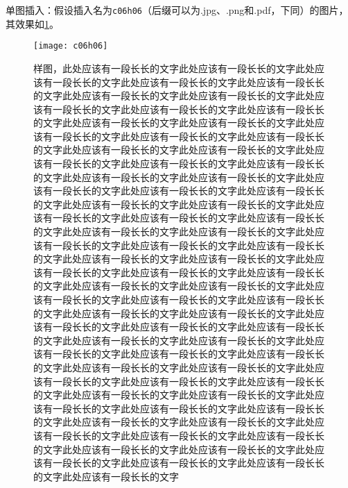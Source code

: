 {单图插入：假设插入名为\verb|c06h06|（后缀可以为.jpg、.png和.pdf，下同）的图片，其效果如\ref{fig:c06h06}。
\begin{figure}[!htbp]
    \centering
    \texttt{[image: c06h06]}
    \caption{样图，此处应该有一段长长的文字此处应该有一段长长的文字此处应该有一段长长的文字此处应该有一段长长的文字此处应该有一段长长的文字此处应该有一段长长的文字此处应该有一段长长的文字此处应该有一段长长的文字此处应该有一段长长的文字此处应该有一段长长的文字此处应该有一段长长的文字此处应该有一段长长的文字此处应该有一段长长的文字此处应该有一段长长的文字此处应该有一段长长的文字此处应该有一段长长的文字此处应该有一段长长的文字此处应该有一段长长的文字此处应该有一段长长的文字此处应该有一段长长的文字此处应该有一段长长的文字此处应该有一段长长的文字此处应该有一段长长的文字此处应该有一段长长的文字此处应该有一段长长的文字此处应该有一段长长的文字此处应该有一段长长的文字此处应该有一段长长的文字此处应该有一段长长的文字此处应该有一段长长的文字此处应该有一段长长的文字此处应该有一段长长的文字此处应该有一段长长的文字此处应该有一段长长的文字此处应该有一段长长的文字此处应该有一段长长的文字此处应该有一段长长的文字此处应该有一段长长的文字此处应该有一段长长的文字此处应该有一段长长的文字此处应该有一段长长的文字此处应该有一段长长的文字此处应该有一段长长的文字此处应该有一段长长的文字此处应该有一段长长的文字此处应该有一段长长的文字此处应该有一段长长的文字此处应该有一段长长的文字此处应该有一段长长的文字此处应该有一段长长的文字此处应该有一段长长的文字此处应该有一段长长的文字此处应该有一段长长的文字此处应该有一段长长的文字此处应该有一段长长的文字此处应该有一段长长的文字此处应该有一段长长的文字此处应该有一段长长的文字此处应该有一段长长的文字此处应该有一段长长的文字此处应该有一段长长的文字此处应该有一段长长的文字此处应该有一段长长的文字此处应该有一段长长的文字此处应该有一段长长的文字此处应该有一段长长的文字此处应该有一段长长的文字此处应该有一段长长的文字此处应该有一段长长的文字此处应该有一段长长的文字此处应该有一段长长的文字此处应该有一段长长的文字此处应该有一段长长的文字此处应该有一段长长的文字此处应该有一段长长的文字此处应该有一段长长的文字}%
    \label{fig:c06h06}
\end{figure}

}
